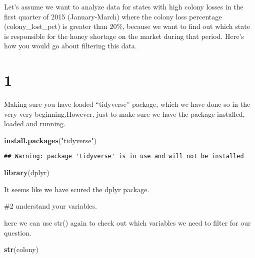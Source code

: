 \documentclass[
]{article}
\newenvironment{Shaded}{\begin{snugshade}}{\end{snugshade}}
\newcommand{\FunctionTok}[1]{\textcolor[rgb]{0.13,0.29,0.53}{\textbf{#1}}}
\newcommand{\NormalTok}[1]{#1}
\newcommand{\StringTok}[1]{\textcolor[rgb]{0.31,0.60,0.02}{#1}}
\begin{document}
Let's assume we want to analyze data for states with high colony losses
in the first quarter of 2015 (January-March) where the colony loss
percentage (colony\_lost\_pct) is greater than 20\%, because we want to
find out which state is responsible for the honey shortage on the market
during that period. Here's how you would go about filtering this data.

\section{1}\label{section}

Making sure you have loaded ``tidyverse'' package, which we have done so
in the very very beginning.However, just to make sure we have the
package installed, loaded and running.

\begin{Shaded}
\begin{Highlighting}[]
\FunctionTok{install.packages}\NormalTok{(}\StringTok{"tidyverse"}\NormalTok{)}
\end{Highlighting}
\end{Shaded}

\begin{verbatim}
## Warning: package 'tidyverse' is in use and will not be installed
\end{verbatim}

\begin{Shaded}
\begin{Highlighting}[]
\FunctionTok{library}\NormalTok{(dplyr)}
\end{Highlighting}
\end{Shaded}

It seems like we have scured the dplyr package.

\#2 understand your variables.

here we can use str() again to check out which variables we need to
filter for our question.

\begin{Shaded}
\begin{Highlighting}[]
\FunctionTok{str}\NormalTok{(colony)}
\end{Highlighting}
\end{Shaded}
\end{document}

